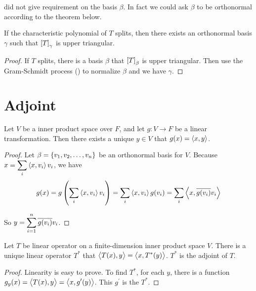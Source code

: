  did not give requirement on the basis $\beta$. In fact we could ask $\beta$ to be orthonormal according to the theorem below.

\begin{theorem}[Schur]\label{schur_theorem}
    If the characteristic polynomial of $T$ splits, then there exists an orthonormal basis $\gamma$ such that $\coordinate{T}_\gamma$ is upper triangular.
\end{theorem}
\begin{proof}
    If $T$ splits, there is a basis $\beta$ that $\coordinate{T}_\beta$ is upper triangular. Then use the Gram-Schmidt process () to normalize $\beta$ and we have $\gamma$.
\end{proof}



\section{Adjoint}

\begin{theorem}
Let $V$ be a inner product space over $F$, and let $g: V \rightarrow F$ be a linear transformation. Then there exists a unique $y \in V$ that $g(x) = \left\langle \displaystyle x, y \right\rangle$.
\end{theorem}
\begin{proof}
    Let $\beta = \set{v_1, v_2, \dots, v_n}$ be an orthonormal basis for $V$. Because $\displaystyle x = \sum_i \left\langle \displaystyle x, v_i \right\rangle v_i$, we have
    \begin{equation}
        g(x) = g\left(\sum_i \left\langle \displaystyle x, v_i \right\rangle v_i \right) = \sum_i \left\langle \displaystyle x, v_i \right\rangle g(v_i) = \sum_i \left\langle \displaystyle x, \overline{g(v_i)}v_i \right\rangle
    \end{equation}
    
    So $\displaystyle y = \sum_{i=1}^n \overline{g(v_i)} v_i$.
\end{proof}


\begin{theorem}[Adjoint]\label{adjoint_operator_definition}
    Let $T$ be linear operator on a finite-dimension inner product space $V$. There is a unique linear operator $T^*$ that $\left\langle \displaystyle T(x), y \right\rangle = \left\langle \displaystyle x, T^* (y) \right\rangle$. $T^*$ is the adjoint of $T$.
\end{theorem}
\begin{proof}
    Linearity is easy to prove. To find $T^*$, for each $y$, there is a function $g_y (x) = \left\langle \displaystyle T(x), y \right\rangle = \left\langle \displaystyle x, g^\prime (y) \right\rangle$. This $g^\prime$ is the $T^*$.
\end{proof}

